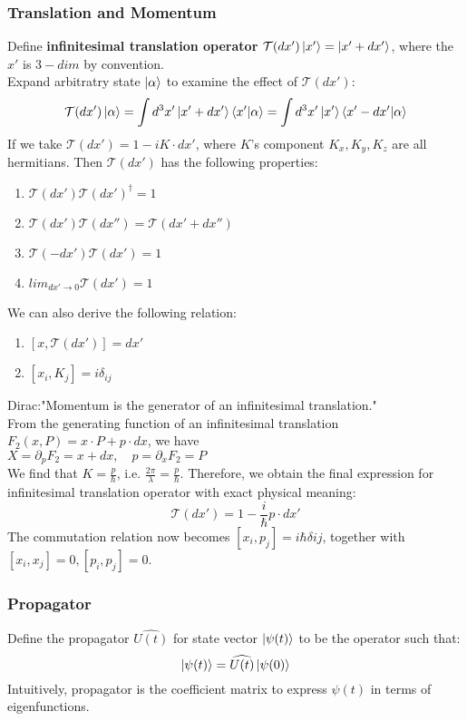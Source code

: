 \documentclass[a4paper, 11pt]{article}
\begin{document}
\subsubsection{Translation and Momentum}
Define \textbf{infinitesimal translation operator} $\mathcal{T}(dx')\ket{x'} = \ket{x' + dx'}$, where the $x'$ is $3-dim$ by convention.\\
\indent Expand arbitratry state $\ket{\alpha}$ to examine the effect of $\mathcal{T}(dx')$:
\begin{equation}
\mathcal{T}(dx')\ket{\alpha} = \int d^3x'\ket{x'+dx'}\braket{x'|\alpha} = \int d^3x'\ket{x'}\braket{x'-dx'|\alpha}
\end{equation}
\indent If we take $\mathcal{T}(dx') =  1 - i K \cdot dx'$, where $K$'s component $K_x, K_y, K_z$ are all hermitians. Then $\mathcal{T}(dx')$ has the following properties:
\begin{enumerate}
	\item $\mathcal{T}(dx') \mathcal{T}(dx')^{\dag} = 1$
	\item $\mathcal{T}(dx')\mathcal{T}(dx'') = \mathcal{T}(dx'+dx'')$
	\item $\mathcal{T}(- dx')\mathcal{T}(dx') = 1$
	\item $lim_{dx' \rightarrow 0} \mathcal{T}(dx') = 1$
\end{enumerate}
\indent We can also derive the following relation: 
\begin{enumerate}
	\item $[x, \mathcal{T}(dx')] = dx'$ 
	\item $[x_i, K_j] = i \delta_{ij} $
\end{enumerate}
\indent Dirac:"Momentum is the generator of an infinitesimal translation."\\
\indent From the generating function of an infinitesimal translation $F_2(x, P) = x \cdot P + p \cdot dx$, we have \\
\indent $X = \partial_{p}F_2 = x +  dx,\quad p = \partial_x F_2 = P$\\
\indent We find that $K = \frac{p}{\hbar}$, i.e. $\frac{2\pi}{\lambda} = \frac{p}{\hbar}$. Therefore, we obtain the final expression for infinitesimal translation operator with exact physical meaning:
\begin{equation}
\mathcal{T}(dx') = 1 - \frac{i}{\hbar}p\cdot dx'
\end{equation}
The commutation relation now becomes $[x_i, p_j] = i\hbar \delta{ij}$, together with $[x_i, x_j] = 0, [p_i, p_j] = 0$.

\subsubsection{Propagator}
Define the propagator $\widehat{U(t)}$ for state vector $\ket{\psi(t)}$ to be the operator such that:
\begin{equation}
\ket{\psi(t)} = \widehat{U(t)}\ket{\psi(0)}
\end{equation}
\indent Intuitively, propagator is the coefficient matrix to express $\psi(t)$ in terms of eigenfunctions.
\end{document}
